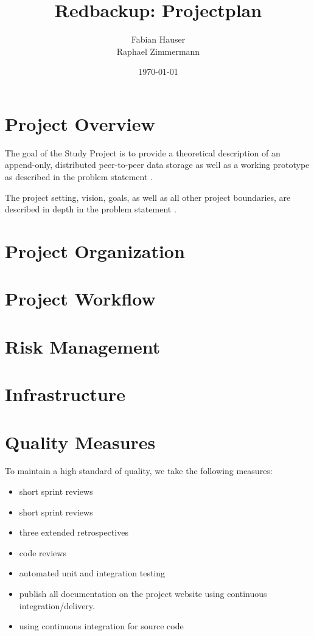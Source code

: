 \documentclass[a4paper]{article}
\title{Redbackup: Projectplan}
\author{
		Fabian Hauser \\
		Raphael Zimmermann
}
\date{\today}
\begin{document}
\maketitle

\section{Project Overview}
The goal of the Study Project is to provide a theoretical description of an append-only, distributed peer-to-peer data storage as well as a working prototype as described in the problem statement \cite{problemstatement}.

The project setting, vision, goals, as well as all other project boundaries, are described in depth in the problem statement \cite{problemstatement}.

\section{Project Organization}


\section{Project Workflow}


\section{Risk Management}

\section{Infrastructure}

\section{Quality Measures}
To maintain a high standard of quality, we take the following measures:

\begin{multicols}{2}
	\begin{itemize}
		\item short sprint reviews
	    \item short sprint reviews
	    \item three extended retrospectives
	    \item code reviews
	    \item automated unit and integration testing
	    \item publish all documentation on the project website using continuous integration/delivery.
	    \item using continuous integration for source code
	\end{itemize}
\end{multicols}
\end{document}
